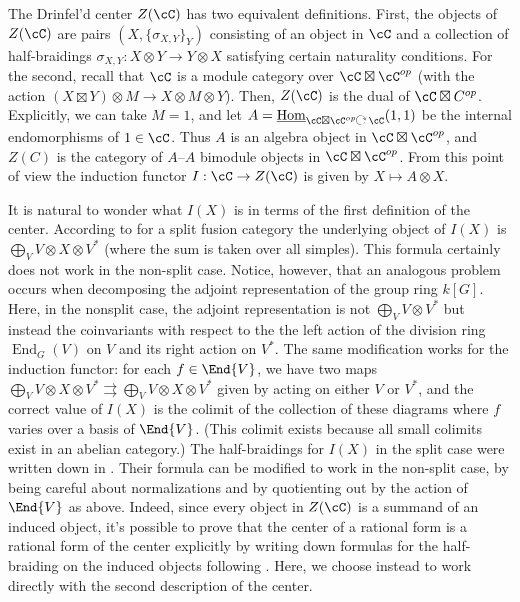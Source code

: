 The Drinfel'd center $Z(\cC)$ has two equivalent definitions.  First, the objects of $Z(\cC)$ are pairs $(X, \{\sigma_{X,Y}\}_Y)$ consisting of an object in $\cC$ and a collection of half-braidings $\sigma_{X,Y}: X \otimes Y \rightarrow Y \otimes X$ satisfying certain naturality conditions.  For the second, recall that $\cC$ is a module category over $\cC \boxtimes \cC^{op}$  (with the action $(X\boxtimes Y) \otimes M \rightarrow X \otimes M \otimes Y$).  Then, $Z(\cC)$ is the dual of $\cC \boxtimes C^{op}$.  Explicitly, we can take $M = 1$, and let $A = \iHom_{\cC \boxtimes \cC^{op} \actson \cC}(1,1)$ be the internal endomorphisms of $1 \in \cC$.  Thus $A$ is an algebra object in $\cC \boxtimes \cC^{op}$, and $Z(C)$ is the category of $A$--$A$ bimodule objects in $\cC \boxtimes \cC^{op}$.  From this point of view the induction functor $I: \cC \rightarrow Z(\cC)$ is given by $X \mapsto A \otimes X$.

\begin{rem}
It is natural to wonder what $I(X)$ is in terms of the first definition of the center.  According to \cite[Prop. 5.4]{MR2183279} for a split fusion category the underlying object of $I(X)$ is $\bigoplus_V V \otimes X \otimes V^*$ (where the sum is taken over all simples).  This formula certainly does not work in the non-split case.  Notice, however, that an analogous problem occurs when decomposing the adjoint representation of the group ring $k[G]$.  Here, in the nonsplit case, the adjoint representation is not $\bigoplus_V V \otimes V^*$ but instead the coinvariants with respect to the the left action of the division ring $\operatorname{End}_G (V)$ on $V$ and its right action on $V^*$.  The same modification works for the induction functor: for each $f \in \End{V}$, we have two maps $\bigoplus_V V \otimes X \otimes V^* \rightrightarrows \bigoplus_V V \otimes X \otimes V^*$ given by acting on either $V$ or $V^*$, and the correct value of $I(X)$ is the colimit of the collection of these diagrams where $f$ varies over a basis of $\End{V}$.  (This colimit exists because all small colimits exist in an abelian category.)  The half-braidings for $I(X)$ in the split case were written down in \cite[Theorem 2.3]{1004.1533}.  Their formula can be modified to work in the non-split case, by being careful about normalizations and by quotienting out by the action of $\End{V}$ as above.  Indeed, since every object in $Z(\cC)$ is a summand of an induced object, it's possible to prove that the center of a rational form is a rational form of the center explicitly by writing down formulas for the half-braiding on the induced objects following \cite[Theorem 2.3]{1004.1533}.  Here, we choose instead to work directly with the second description of the center.
\end{rem}

